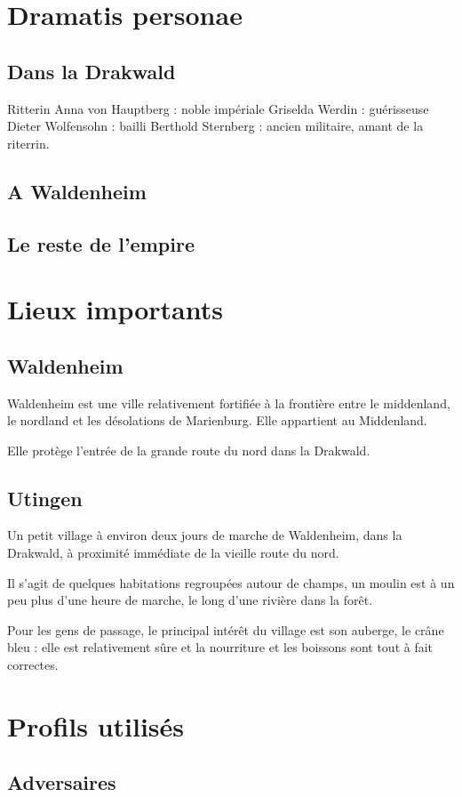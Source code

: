 \documentclass[10pt,a4paper]{book}
\begin{document}
\chapter{Dramatis personae}
\section{Dans la Drakwald}
Ritterin Anna von Hauptberg : noble impériale
Griselda Werdin : guérisseuse
Dieter Wolfensohn : bailli
Berthold Sternberg : ancien militaire, amant de la riterrin.
\section{A Waldenheim}
\section{Le reste de l'empire}

\chapter{Lieux importants}
\section{Waldenheim}
Waldenheim est une ville relativement fortifiée à la frontière entre le middenland, le nordland et les désolations de Marienburg. Elle appartient au Middenland.

Elle protège l'entrée de la grande route du nord dans la Drakwald.
\section{Utingen}
Un petit village à environ deux jours de marche de Waldenheim, dans la Drakwald, à proximité immédiate de la vieille route du nord. 

Il s'agit de quelques habitations regroupées autour de champs, un moulin est à un peu plus d'une heure de marche, le long d'une rivière dans la forêt. 

Pour les gens de passage, le principal intérêt du village est son auberge, le crâne bleu : elle est relativement sûre et la nourriture et les boissons sont tout à fait correctes.
\chapter{Profils utilisés}
\section{Adversaires}
\end{document}
